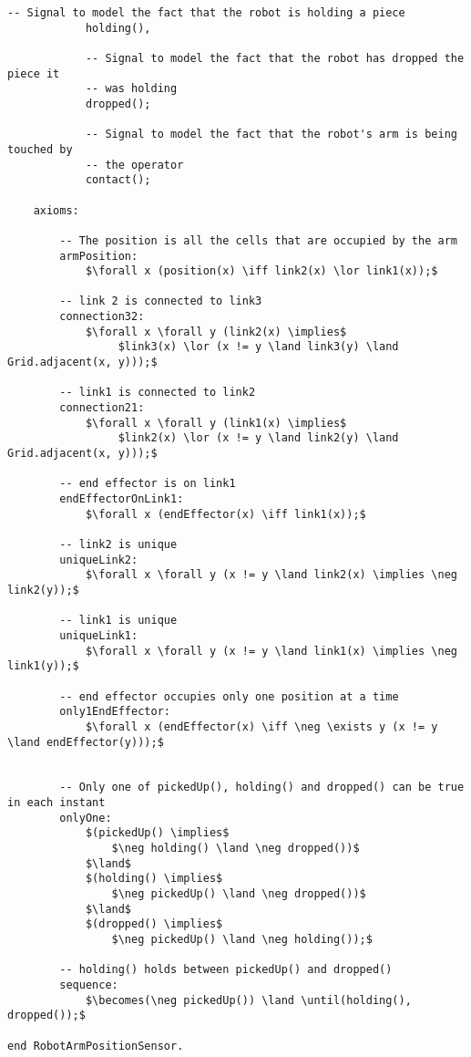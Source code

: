 \begin{lstlisting}[fontadjust, mathescape, frame=single]
            -- Signal to model the fact that the robot is holding a piece
            holding(),

            -- Signal to model the fact that the robot has dropped the piece it
            -- was holding
            dropped();

            -- Signal to model the fact that the robot's arm is being touched by
            -- the operator
            contact();

    axioms:

        -- The position is all the cells that are occupied by the arm
        armPosition: 
            $\forall x (position(x) \iff link2(x) \lor link1(x));$
        
        -- link 2 is connected to link3
        connection32: 
            $\forall x \forall y (link2(x) \implies$
                 $link3(x) \lor (x != y \land link3(y) \land Grid.adjacent(x, y)));$

        -- link1 is connected to link2
        connection21: 
            $\forall x \forall y (link1(x) \implies$ 
                 $link2(x) \lor (x != y \land link2(y) \land Grid.adjacent(x, y)));$

        -- end effector is on link1
        endEffectorOnLink1:
            $\forall x (endEffector(x) \iff link1(x));$

        -- link2 is unique
        uniqueLink2: 
            $\forall x \forall y (x != y \land link2(x) \implies \neg link2(y));$

        -- link1 is unique
        uniqueLink1: 
            $\forall x \forall y (x != y \land link1(x) \implies \neg link1(y));$

        -- end effector occupies only one position at a time
        only1EndEffector:
            $\forall x (endEffector(x) \iff \neg \exists y (x != y \land endEffector(y)));$

            
        -- Only one of pickedUp(), holding() and dropped() can be true in each instant
        onlyOne:
            $(pickedUp() \implies$
                $\neg holding() \land \neg dropped())$
            $\land$
            $(holding() \implies$ 
                $\neg pickedUp() \land \neg dropped())$
            $\land$
            $(dropped() \implies$
                $\neg pickedUp() \land \neg holding());$

        -- holding() holds between pickedUp() and dropped()
        sequence:
            $\becomes(\neg pickedUp()) \land \until(holding(), dropped());$

end RobotArmPositionSensor.
\end{lstlisting}